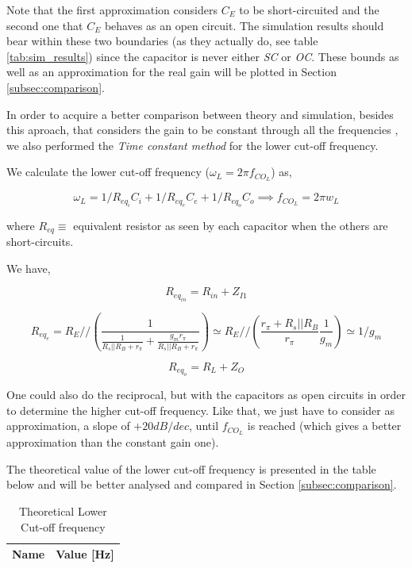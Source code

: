 Note that the first approximation considers $C_E$ to be short-circuited and the second one that $C_E$ behaves as an open circuit. The simulation results should bear within these two boundaries (as they actually do, see table \ref{tab:sim_results}) since the capacitor is never either \textit{SC} or \textit{OC}. These bounds as well as an approximation for the real gain will be plotted in Section \ref{subsec:comparison}.

In order to acquire a better comparison between theory and simulation, besides this aproach, that considers the gain to be constant through all the frequencies , we also performed the \textit{Time constant method} for the lower cut-off frequency.

We calculate the lower cut-off frequency ($\omega_L=2\pi f_{CO_L}$) as,

\begin{equation}
    \omega_L=1/{R_{eq_i}C_i} + 1/{R_{eq_e}C_e} + 1/{R_{eq_o}C_o}
    \implies f_{CO_L}=2\pi w_L
\end{equation}

where $R_{eq}\equiv$ equivalent resistor as seen by each capacitor when the others are short-circuits.

We have,

\begin{equation}
    R_{eq_{in}} = R_{in}+Z_{I1}
\end{equation}

\begin{equation}
    R_{eq_e} = R_E // (\frac{1}{\frac{1}{R_s||R_B+r_{\pi}}+\frac{g_m r_{\pi}}{R_s||R_B+r_{\pi}}}) \simeq R_E//(\frac{r_{\pi}+R_s||R_B}{r_{\pi}}\frac{1}{g_m}) \simeq 1/g_{m}
\end{equation}

\begin{equation}
    R_{eq_o}=R_L+Z_{O}
\end{equation}

One could also do the reciprocal, but with the capacitors as open circuits in order to determine the higher cut-off frequency.
Like that, we just have to consider as approximation, a slope of $+20dB/dec$, until $f_{CO_L}$ is reached (which gives a better approximation than the constant gain one).

The theoretical value of the lower cut-off frequency is presented in the table below and will be better analysed and compared in Section \ref{subsec:comparison}.

\begin{table}[h]
    \centering
    \begin{tabular}{|l|c|}
    \hline
    {\bf Name} & {\bf Value [Hz]} \\ \hline
    
    \end{tabular}
    \caption{Theoretical Lower Cut-off frequency}
    \label{tab:theo_CO_freq}
\end{table}

